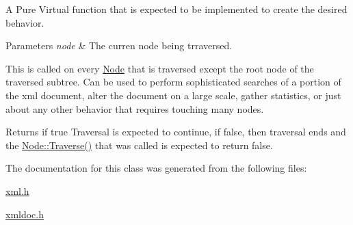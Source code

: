 A Pure Virtual function that is expected to be implemented to create the desired behavior. 


\begin{DoxyParams}{Parameters}
{\em node} & The curren node being trraversed.\\
\hline
\end{DoxyParams}
This is called on every \hyperlink{classphys_1_1xml_1_1Node}{Node} that is traversed except the root node of the traversed subtree. Can be used to perform sophisticated searches of a portion of the xml document, alter the document on a large scale, gather statistics, or just about any other behavior that requires touching many nodes. \begin{DoxyReturn}{Returns}
if true Traversal is expected to continue, if false, then traversal ends and the \hyperlink{classphys_1_1xml_1_1Node_a0029d08d3689c36d882ada0c0c9cf6e9}{Node::Traverse()} that was called is expected to return false. 
\end{DoxyReturn}


The documentation for this class was generated from the following files:\begin{DoxyCompactItemize}
\item 
\hyperlink{xml_8h}{xml.h}\item 
\hyperlink{xmldoc_8h}{xmldoc.h}\end{DoxyCompactItemize}
